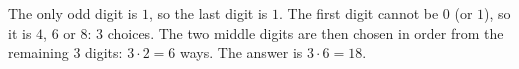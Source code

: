 The only odd digit is $1$, so the last digit is $1$. The first digit cannot be $0$ (or $1$), so it is $4$, $6$ or $8$: $3$ choices. The two middle digits are then chosen in order from the remaining $3$ digits: $3\cdot2=6$ ways. The answer is $3\cdot6=\boxed{18}$.
